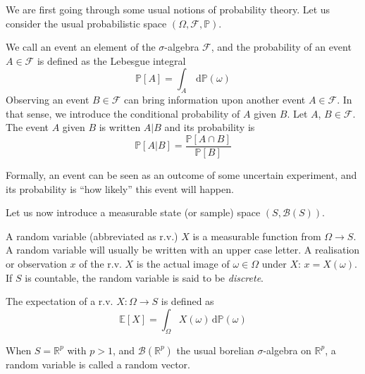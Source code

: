\documentclass[a4paper,11pt]{article}
\newcommand{\Ex}{\mathbb{E}}
\newcommand{\Prob}{\mathbb{P}}
\theoremstyle{defi}
\numberwithin{thmCounter}{section}
\begin{document}
We are first going through some usual notions of probability theory. 
Let us consider the usual probabilistic space $(\Omega, \mathcal{F}, \Prob)$.
\begin{definition}
  \label{def:prob_event}
   We call an event an element of the $\sigma$-algebra $\mathcal{F}$, and the probability of an event $A\in \mathcal{F}$ is defined as the Lebesgue integral
  \begin{equation}
    \Prob[A] = \int_{A} \,\mathrm{d}\Prob(\omega)
  \end{equation}
Observing an event $B \in \mathcal{F}$ can bring information upon another event $A\in \mathcal{F}$. In that sense, we introduce the conditional probability of $A$ given $B$.
\label{def:cond_proba}
  Let $A$, $B \in \mathcal{F}$.
  The event $A$ given $B$ is written $A | B$ and its probability is
  \begin{equation}
    \Prob[A | B] = \frac{\Prob[A \cap B]}{\Prob[B]}
  \end{equation}
\end{definition}
Formally, an event can be seen as an outcome of some uncertain experiment, and its probability is ``how likely'' this event will happen.

Let us now introduce a measurable state (or sample) space $(S, \mathcal{B}(S))$.
\begin{definition}
  \label{def:random_variable}
  A random variable (abbreviated as r.v.) $X$ is a measurable function from $\Omega \longrightarrow S$. A random variable will usually be written with an upper case letter. A realisation or observation $x$ of the r.v. $X$ is the actual image of $\omega\in\Omega$ under $X$: $x = X(\omega)$. If $S$ is countable, the random variable is said to be \emph{discrete}.
  
  \label{def:expectation}
  The expectation of a r.v. $X:\Omega \rightarrow S$ is defined as
  \begin{equation*}
    \Ex[X] = \int_{\Omega} X(\omega) \,\mathrm{d}\Prob(\omega)
  \end{equation*}
\end{definition}
\begin{remark}
  When $S = \mathbb{R}^p$ with $p > 1$, and $\mathcal{B}(\mathbb{R}^p)$ the usual borelian $\sigma$-algebra on $\mathbb{R}^p$, a random variable is called a random vector.
\end{remark}
\end{document}
